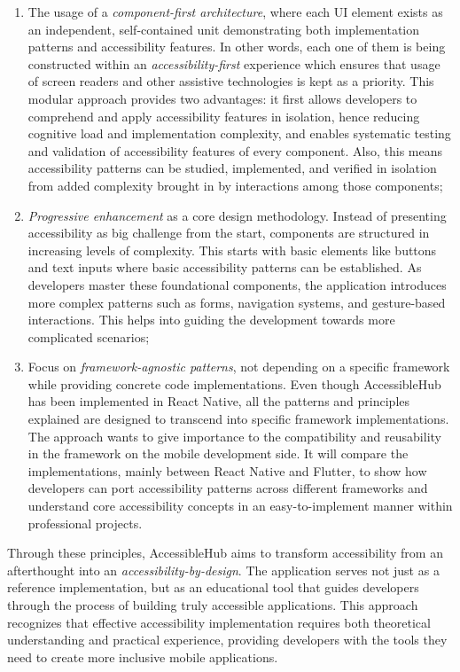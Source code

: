 \begin{enumerate}
    \item The usage of a \textit{component-first architecture}, where each UI element exists as an independent, self-contained unit demonstrating both implementation patterns and accessibility features. In other words, each one of them is being constructed within an \textit{accessibility-first} experience which ensures that usage of screen readers and other assistive technologies is kept as a priority. This modular approach provides two advantages: it first allows developers to comprehend and apply accessibility features in isolation, hence reducing cognitive load and implementation complexity, and enables systematic testing and validation of accessibility features of every component. Also, this means accessibility patterns can be studied, implemented, and verified in isolation from added complexity brought in by interactions among those components;

    \item \textit{Progressive enhancement} as a core design methodology. Instead of presenting accessibility as big challenge from the start, components are structured in increasing levels of complexity. This starts with basic elements like buttons and text inputs where basic accessibility patterns can be established. As developers master these foundational components, the application introduces more complex patterns such as forms, navigation systems, and gesture-based interactions. This helps into guiding the development towards more complicated scenarios;

    \item Focus on \textit{framework-agnostic patterns}, not depending on a specific framework while providing concrete code implementations. Even though AccessibleHub has been implemented in React Native, all the patterns and principles explained are designed to transcend into specific framework implementations. The approach wants to give importance to the compatibility and reusability in the framework on the mobile development side. It will compare the implementations, mainly between React Native and Flutter, to show how developers can port accessibility patterns across different frameworks and understand core accessibility concepts in an easy-to-implement manner within professional projects. 
    
\end{enumerate}

Through these principles, AccessibleHub aims to transform accessibility from an afterthought into an \textit{accessibility-by-design}. The application serves not just as a reference implementation, but as an educational tool that guides developers through the process of building truly accessible applications. This approach recognizes that effective accessibility implementation requires both theoretical understanding and practical experience, providing developers with the tools they need to create more inclusive mobile applications.

